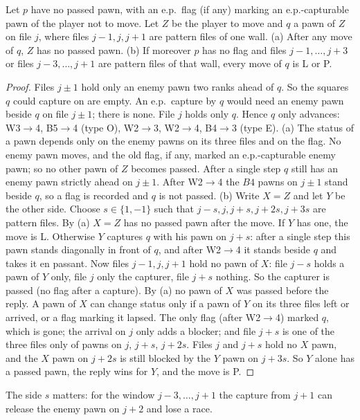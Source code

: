 \begin{wlemma}
Let $p$ have no passed pawn, with an e.p.\ flag (if any) marking an e.p.-capturable pawn of the player not to move. Let $Z$ be the player to move and
$q$ a pawn of $Z$ on file $j$, where files $j-1,j,j+1$ are pattern files of one wall.
(a) After any move of $q$, $Z$ has no passed pawn.
(b) If moreover $p$ has no flag and files $j-1,\dots,j+3$ or files $j-3,\dots,j+1$ are pattern files of that wall, every move of $q$ is
L or P.
\end{wlemma}
\begin{proof}
Files $j\pm1$ hold only an enemy pawn two ranks ahead of $q$. So the squares $q$ could capture on are empty. An e.p.\ capture by $q$
would need an enemy pawn beside $q$ on file $j\pm1$; there is none. File $j$ holds only $q$. Hence $q$ only advances: W3$\to$4, B5$\to$4 (type O),
W2$\to$3, W2$\to$4, B4$\to$3 (type E).
(a) The status of a pawn depends only on the enemy pawns on its three files and on the flag. No enemy pawn moves, and the old flag,
if any, marked an e.p.-capturable enemy pawn; so no other pawn of $Z$ becomes passed. After a single step $q$ still has an enemy pawn strictly
ahead on $j\pm1$. After W2$\to$4 the $B4$ pawns on $j\pm1$ stand beside $q$, so a flag is recorded and $q$ is not passed.
(b) Write $X=Z$ and let $Y$ be the other side. Choose $s\in\{1,-1\}$ such that $j-s,j,j+s,j+2s,j+3s$ are pattern files. By (a) $X=Z$ has no passed pawn after the move. If $Y$
has one, the move is L. Otherwise $Y$ captures $q$ with his pawn on $j+s$: after a single step this pawn stands diagonally in front of $q$, and after
W2$\to$4 it stands beside $q$ and takes it en passant. Now files $j-1,j,j+1$ hold no pawn of $X$: file $j-s$ holds a pawn of $Y$ only, file
$j$ only the capturer, file $j+s$ nothing. So the capturer is passed (no flag after a capture). By (a) no pawn of $X$ was passed before the reply. A pawn of $X$ can change status only if a pawn of $Y$ on its three files left or
arrived, or a flag marking it lapsed. The only flag (after W2$\to$4) marked $q$, which is gone; the arrival on $j$ only adds a
blocker; and file $j+s$ is one of the three files only of pawns on $j$, $j+s$, $j+2s$. Files $j$ and $j+s$ hold no $X$ pawn, and the
$X$ pawn on $j+2s$ is still blocked by the $Y$ pawn on $j+3s$. So $Y$ alone has a passed pawn, the reply wins for $Y$, and the move is P.
\end{proof}
The side $s$ matters: for the window $j-3,\dots,j+1$ the capture from $j+1$ can release the enemy pawn on $j+2$ and lose a race.

